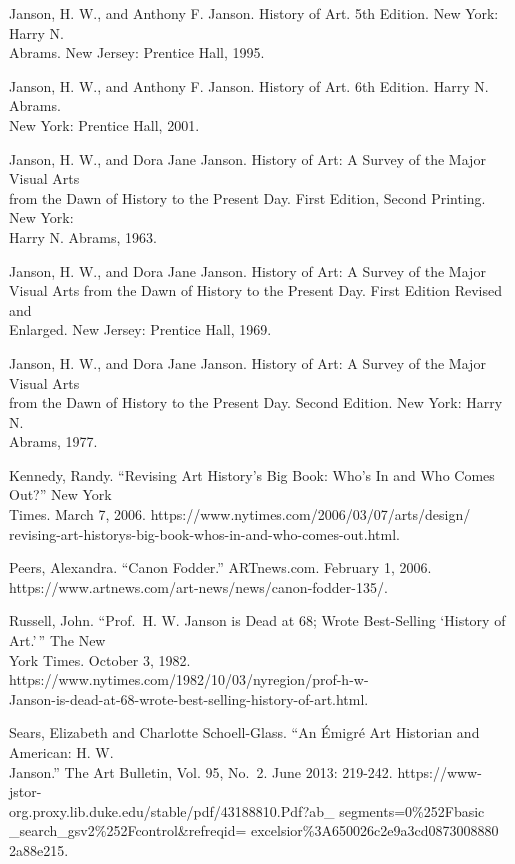 \documentclass[
  letterpaper,
  DIV=11,
  numbers=noendperiod]{scrreprt}
\begin{document}
Janson, H. W., and Anthony F. Janson. History of Art. 5th Edition. New
York: Harry N.\\
Abrams. New Jersey: Prentice Hall, 1995.~

Janson, H. W., and Anthony F. Janson. History of Art. 6th Edition. Harry
N. Abrams.\\
New York: Prentice Hall, 2001.

Janson, H. W., and Dora Jane Janson. History of Art: A Survey of the
Major Visual Arts\\
from the Dawn of History to the Present Day. First Edition, Second
Printing. New York:\\
Harry N. Abrams, 1963.~

Janson, H. W., and Dora Jane Janson. History of Art: A Survey of the
Major\\
Visual Arts from the Dawn of History to the Present Day. First Edition
Revised and\\
Enlarged. New Jersey: Prentice Hall, 1969.

Janson, H. W., and Dora Jane Janson. History of Art: A Survey of the
Major Visual Arts\\
from the Dawn of History to the Present Day. Second Edition. New York:
Harry N.\\
Abrams, 1977.~

Kennedy, Randy. ``Revising Art History's Big Book: Who's In and Who
Comes Out?'' New York\\
Times. March 7, 2006. https://www.nytimes.com/2006/03/07/arts/design/\\
revising-art-historys-big-book-whos-in-and-who-comes-out.html.

Peers, Alexandra. ``Canon Fodder.'' ARTnews.com. February 1, 2006.\\
https://www.artnews.com/art-news/news/canon-fodder-135/.~

Russell, John. ``Prof.~H. W. Janson is Dead at 68; Wrote Best-Selling
`History of Art.'\,'' The New\\
York Times. October 3, 1982.
https://www.nytimes.com/1982/10/03/nyregion/prof-h-w-\\
Janson-is-dead-at-68-wrote-best-selling-history-of-art.html.

Sears, Elizabeth and Charlotte Schoell-Glass. ``An Émigré Art Historian
and American: H. W.\\
Janson.'' The Art Bulletin, Vol. 95, No.~2. June 2013: 219-242.
https://www-jstor-\\
org.proxy.lib.duke.edu/stable/pdf/43188810.Pdf?ab\_
segments=0\%252Fbasic\\
\_search\_gsv2\%252Fcontrol\&refreqid=
excelsior\%3A650026c2e9a3cd0873008880\\
2a88e215.
\end{document}
